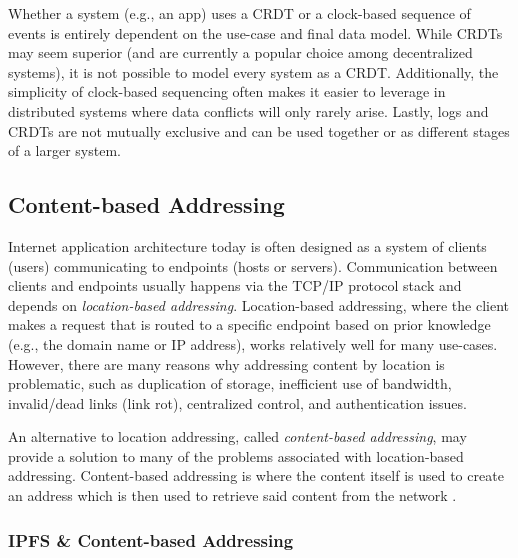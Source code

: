 \documentclass{textile}
\begin{document}
Whether a system (e.g., an app) uses a CRDT or a clock-based sequence of events is entirely dependent on the use-case and final data model. While CRDTs may seem superior (and are currently a popular choice among decentralized systems), it is not possible to model every system as a CRDT. Additionally, the simplicity of clock-based sequencing often makes it easier to leverage in distributed systems where data conflicts will only rarely arise. Lastly, logs and CRDTs are not mutually exclusive and can be used together or as different stages of a larger system.

\subsection{Content-based Addressing}

Internet application architecture today is often designed as a system of clients (users) communicating to endpoints (hosts or servers). Communication between clients and endpoints usually happens via the TCP/IP protocol stack and depends on \emph{location-based addressing}. Location-based addressing, where the client makes a request that is routed to a specific endpoint based on prior knowledge (e.g., the domain name or IP address), works relatively well for many use-cases. However, there are many reasons why addressing content by location is problematic, such as duplication of storage, inefficient use of bandwidth, invalid/dead links (link rot), centralized control, and authentication issues.

An alternative to location addressing, called \emph{content-based addressing}, may provide a solution to many of the problems associated with location-based addressing. Content-based addressing is where the content itself is used to create an address which is then used to retrieve said content from the network \cite{mortContentBasedAddressing2012}.

\subsubsection{IPFS \& Content-based Addressing}
\end{document}
